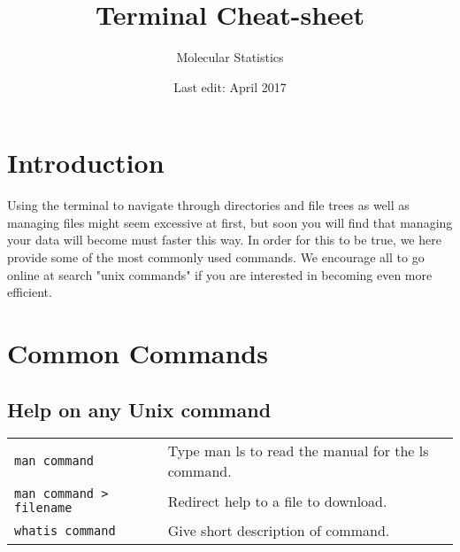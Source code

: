 \documentclass{article}
\title{Terminal Cheat-sheet}
\author{Molecular Statistics}
\date{Last edit: April 2017}
\begin{document}
\newcommand{\ti}[1]{\texttt{\textit{#1}}}
\renewcommand{\arraystretch}{2}


\maketitle

\section{Introduction}

Using the terminal to navigate through directories and file trees as well as managing files might seem excessive at first, but soon you will find that managing your data will become must faster this way. In order for this to be true, we here provide some of the most commonly used commands. We encourage all to go online at search "unix commands" if you are interested in becoming even more efficient. 

\section{Common Commands}
\subsection{Help on any Unix command}
\begin{table}[h]
\begin{tabular}{ll}
 	\texttt{man {command}} &	Type man ls to read the manual for the ls command. \\
	\texttt{man {command} > {filename}} &	Redirect help to a file to download. \\
	\texttt{whatis {command}} &	Give short description of command.\\
\end{tabular}
\end{table}
\end{document}
